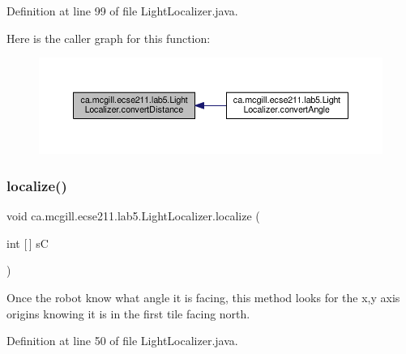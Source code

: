 Definition at line 99 of file Light\+Localizer.\+java.

Here is the caller graph for this function\+:\nopagebreak
\begin{figure}[H]
\begin{center}
\leavevmode
\includegraphics[width=350pt]{classca_1_1mcgill_1_1ecse211_1_1lab5_1_1_light_localizer_a9eebe889aa2d4d2e881f413cc727cd9c_icgraph}
\end{center}
\end{figure}
\mbox{\label{classca_1_1mcgill_1_1ecse211_1_1lab5_1_1_light_localizer_a441f56a899fae5bc9c1d6a6d25fbe0bb}} 
\subsubsection{\texorpdfstring{localize()}{localize()}}
{\footnotesize\ttfamily void ca.\+mcgill.\+ecse211.\+lab5.\+Light\+Localizer.\+localize (\begin{DoxyParamCaption}\item[{int \mbox{[}$\,$\mbox{]}}]{sC }\end{DoxyParamCaption})}

Once the robot know what angle it is facing, this method looks for the x,y axis origins knowing it is in the first tile facing north. 

Definition at line 50 of file Light\+Localizer.\+java.

